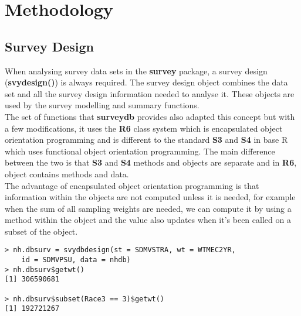 
\chapter{Methodology} \label{c2} %



\newcommand{\keyword}[1]{\textbf{#1}}
\newcommand{\tabhead}[1]{\textbf{#1}}
\newcommand{\code}[1]{\texttt{#1}}
\newcommand{\file}[1]{\texttt{\bfseries#1}}
\newcommand{\option}[1]{\texttt{\itshape#1}}

\section{Survey Design} \label{c2.1}
When analysing survey data sets in the {\bf survey} package, a survey design ({\bf svydesign()}) is always required. The survey design object combines the data set and all the survey design information needed to analyse it. These objects are used by the survey modelling and summary functions.\\

The set of functions that {\bf surveydb} provides also adapted this concept but with a few modifications, it uses the {\bf R6} \citep{R6package} class system which is encapsulated object orientation programming and is different to the standard {\bf S3} and {\bf S4} in base {\sf R} which uses functional object orientation programming. The main difference between the two is that {\bf S3} and {\bf S4} methods and objects are separate and in {\bf R6}, object contains methods and data. \\

The advantage of encapsulated object orientation programming is that information within the objects are not computed unless it is needed, for example when the sum of all sampling weights are needed, we can compute it by using a method within the object and the value also updates when it's been called on a subset of the object.

\begin{lstlisting}
> nh.dbsurv = svydbdesign(st = SDMVSTRA, wt = WTMEC2YR, 
    id = SDMVPSU, data = nhdb)
> nh.dbsurv$getwt()
[1] 306590681

> nh.dbsurv$subset(Race3 == 3)$getwt()
[1] 192721267
\end{lstlisting}

